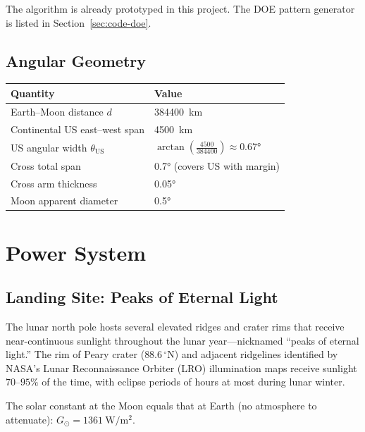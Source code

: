 \documentclass[12pt,letterpaper]{article}
\begin{document}
The algorithm is already prototyped in this project. The DOE pattern generator
is listed in Section~\ref{sec:code-doe}.

\subsection{Angular Geometry}

\begin{center}
\begin{tabular}{ll}
\toprule
\textbf{Quantity} & \textbf{Value} \\
\midrule
Earth--Moon distance $d$ & \SI{384400}{\kilo\meter} \\
Continental US east--west span & \SI{4500}{\kilo\meter} \\
US angular width $\theta_{\text{US}}$ & $\arctan\!\left(\frac{4500}{384400}\right) \approx \ang{0.67}$ \\
Cross total span & \ang{0.7} (covers US with margin) \\
Cross arm thickness & \ang{0.05} \\
Moon apparent diameter & \ang{0.5} \\
\bottomrule
\end{tabular}
\end{center}

\section{Power System}

\subsection{Landing Site: Peaks of Eternal Light}

The lunar north pole hosts several elevated ridges and crater rims that receive
near-continuous sunlight throughout the lunar year---nicknamed ``peaks of
eternal light.'' The rim of Peary crater ($88.6\,^\circ$N) and adjacent
ridgelines identified by NASA's Lunar Reconnaissance Orbiter (LRO) illumination
maps receive sunlight $70$--$95\%$ of the time, with eclipse periods of hours
at most during lunar winter.

The solar constant at the Moon equals that at Earth (no atmosphere to
attenuate): $G_{\odot} = \SI{1361}{\watt\per\meter\squared}$.
\end{document}
